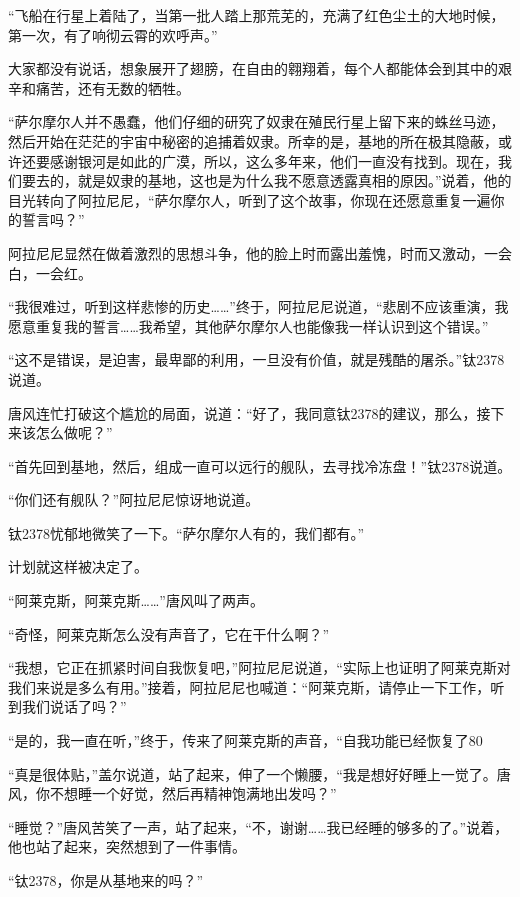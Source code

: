 “飞船在行星上着陆了，当第一批人踏上那荒芜的，充满了红色尘土的大地时候，第一次，有了响彻云霄的欢呼声。” 

大家都没有说话，想象展开了翅膀，在自由的翱翔着，每个人都能体会到其中的艰辛和痛苦，还有无数的牺牲。 

“萨尔摩尔人并不愚蠢，他们仔细的研究了奴隶在殖民行星上留下来的蛛丝马迹，然后开始在茫茫的宇宙中秘密的追捕着奴隶。所幸的是，基地的所在极其隐蔽，或许还要感谢银河是如此的广漠，所以，这么多年来，他们一直没有找到。现在，我们要去的，就是奴隶的基地，这也是为什么我不愿意透露真相的原因。”说着，他的目光转向了阿拉尼尼，“萨尔摩尔人，听到了这个故事，你现在还愿意重复一遍你的誓言吗？” 

阿拉尼尼显然在做着激烈的思想斗争，他的脸上时而露出羞愧，时而又激动，一会白，一会红。 

“我很难过，听到这样悲惨的历史……”终于，阿拉尼尼说道，“悲剧不应该重演，我愿意重复我的誓言……我希望，其他萨尔摩尔人也能像我一样认识到这个错误。” 

“这不是错误，是迫害，最卑鄙的利用，一旦没有价值，就是残酷的屠杀。”钛2378说道。 

唐风连忙打破这个尴尬的局面，说道：“好了，我同意钛2378的建议，那么，接下来该怎么做呢？” 

“首先回到基地，然后，组成一直可以远行的舰队，去寻找冷冻盘！”钛2378说道。 

“你们还有舰队？”阿拉尼尼惊讶地说道。 

钛2378忧郁地微笑了一下。“萨尔摩尔人有的，我们都有。” 

计划就这样被决定了。 

“阿莱克斯，阿莱克斯……”唐风叫了两声。 

“奇怪，阿莱克斯怎么没有声音了，它在干什么啊？” 

“我想，它正在抓紧时间自我恢复吧，”阿拉尼尼说道，“实际上也证明了阿莱克斯对我们来说是多么有用。”接着，阿拉尼尼也喊道：“阿莱克斯，请停止一下工作，听到我们说话了吗？” 

“是的，我一直在听，”终于，传来了阿莱克斯的声音，“自我功能已经恢复了80%

“真是很体贴，”盖尔说道，站了起来，伸了一个懒腰，“我是想好好睡上一觉了。唐风，你不想睡一个好觉，然后再精神饱满地出发吗？” 

“睡觉？”唐风苦笑了一声，站了起来，“不，谢谢……我已经睡的够多的了。”说着，他也站了起来，突然想到了一件事情。 

“钛2378，你是从基地来的吗？” 


